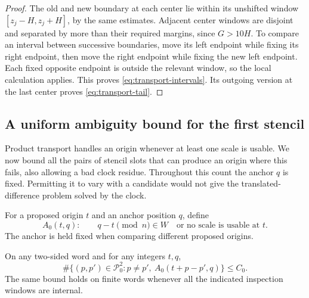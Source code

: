 \begin{proof}
The old and new boundary at each center lie within its unshifted
window $[z_j-H,z_j+H]$, by the same estimates.  Adjacent center
windows are disjoint and separated by more than their required
margins, since $G>10H$.  To compare an interval between successive
boundaries, move its left endpoint while fixing its right endpoint,
then move the right endpoint while fixing the new left endpoint.
Each fixed opposite endpoint is outside the relevant window, so the
local calculation applies.  This proves
\eqref{eq:transport-intervals}.  Its outgoing version at the last
center proves \eqref{eq:transport-tail}.
\end{proof}

\subsection{A uniform ambiguity bound for the first stencil}

Product transport handles an origin whenever at least one scale is usable.
We now bound all the pairs of stencil slots that can produce an origin
where this fails, also allowing a bad clock residue. Throughout this count
the anchor $q$ is fixed. Permitting it to vary with a candidate would not
give the translated-difference problem solved by the clock.

For a proposed origin $t$ and an anchor position $q$, define
\begin{equation}\label{eq:stage0-predicate}
 A_0(t,q):\qquad
     q-t\pmod n\in W
       \quad\text{or no scale is usable at }t.
\end{equation}
The anchor is held fixed when comparing different proposed origins.

\begin{proposition}\label{prop:inner-ambiguity}
On any two-sided word and for any integers $t,q$,
\begin{equation}\label{eq:inner-ambiguity}
 \#\{(p,p')\in\mathcal P_0^2:p\neq p',\
                         A_0(t+p-p',q)\}\leq C_0.
\end{equation}
The same bound holds on finite words whenever all the indicated
inspection windows are internal.
\end{proposition}

